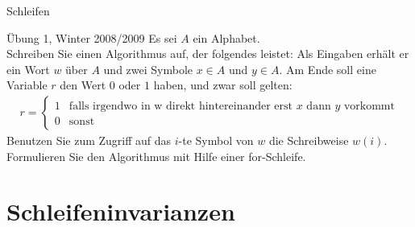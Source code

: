 \documentclass[18pt]{beamer}
\begin{document}
\begin{frame}{Schleifen}
    \begin{exampleblock}{Übung 1, Winter 2008/2009}
        Es sei $A$ ein Alphabet.\\
        Schreiben Sie einen Algorithmus auf, der folgendes leistet: Als Eingaben erhält er ein Wort $w$ über $A$ und zwei Symbole $x \in A$ und $y \in A$. Am Ende soll eine Variable $r$ den Wert $0$ oder $1$ haben, und zwar soll gelten:\\
        \begin{align*}
            r = \begin{cases} 1 & \text{falls irgendwo in w direkt hintereinander erst $x$ dann $y$ vorkommt}\\ 0 &\text{sonst}\end{cases}
        \end{align*}
        Benutzen Sie zum Zugriff auf das $i$-te Symbol von $w$ die Schreibweise $w\left( i\right)$. Formulieren Sie den Algorithmus mit Hilfe einer for-Schleife.
    \end{exampleblock}
\end{frame}

\section{Schleifeninvarianzen}
\end{document}
